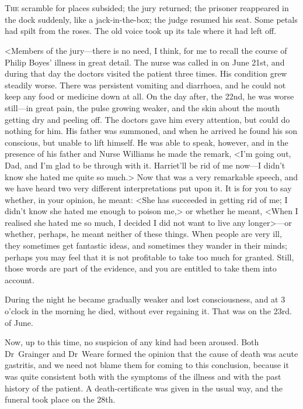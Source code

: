 \chapter[Chapter \thechapter]{}
\lettrine{T}{he} scramble for places subsided; the jury returned; the prisoner reappeared in the dock suddenly, like a jack-in-the-box; the judge resumed his seat. Some petals had spilt from the roses. The old voice took up its tale where it had left off.

<Members of the jury—there is no need, I think, for me to recall the course of Philip Boyes' illness in great detail. The nurse was called in on June 21st, and during that day the doctors visited the patient three times. His condition grew steadily worse. There was persistent vomiting and diarrhoea, and he could not keep any food or medicine down at all. On the day after, the 22nd, he was worse still—in great pain, the pulse growing weaker, and the skin about the mouth getting dry and peeling off. The doctors gave him every attention, but could do nothing for him. His father was summoned, and when he arrived he found his son conscious, but unable to lift himself. He was able to speak, however, and in the presence of his father and Nurse Williams he made the remark, <I'm going out, Dad, and I'm glad to be through with it. Harriet'll be rid of me now—I didn't know she hated me quite so much.> Now that was a very remarkable speech, and we have heard two very different interpretations put upon it. It is for you to say whether, in your opinion, he meant: <She has succeeded in getting rid of me; I didn't know she hated me enough to poison me,> or whether he meant, <When I realised she hated me so much, I decided I did not want to live any longer>—or whether, perhaps, he meant neither of these things. When people are very ill, they sometimes get fantastic ideas, and sometimes they wander in their minds; perhaps you may feel that it is not profitable to take too much for granted. Still, those words are part of the evidence, and you are entitled to take them into account.

During the night he became gradually weaker and lost consciousness, and at 3 o'clock in the morning he died, without ever regaining it. That was on the 23rd. of June.

Now, up to this time, no suspicion of any kind had been aroused. Both Dr~Grainger and Dr~Weare formed the opinion that the cause of death was acute gastritis, and we need not blame them for coming to this conclusion, because it was quite consistent both with the symptoms of the illness and with the past history of the patient. A death-certificate was given in the usual way, and the funeral took place on the 28th.

